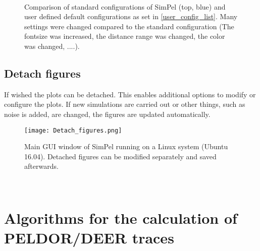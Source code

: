 \documentclass[pdftex,bezier,german,a4,twoside, headexclude,12pt,nochapterprefix, titlepage]{extarticle}
\newcommand{\simpel}{\textsf{SimPel} }
\newcommand{\figspace}{\hspace{0.5cm}}
\begin{document}
\begin{figure}[!htb]
\centering
     \figspace
      \\[-0.3cm]
     \figspace
    \caption{Comparison of standard configurations of \simpel (top, blue) and user defined default configurations as set in \autoref{user_config_list}. Many settings were changed compared to the standard configuration (The fontsize was increased, the distance range was changed, the color was changed, ....).}
\label{Different_config_figures}
\end{figure} 



\subsection{Detach figures}
If wished the plots can be detached. This enables additional options to modify or configure the plots. If new simulations are carried out
or other things, such as noise is added, are changed, the figures are updated automatically.
\begin{figure}[h!]
\begin{center}
\texttt{[image: Detach\_figures.png]}
\caption{Main GUI window of \simpel running on a Linux system (Ubuntu 16.04). Detached figures can be modified separately and saved afterwards.}
\label{Detach_figure}
\end{center}
\end{figure}
\
\\
\newpage
\section{Algorithms for the calculation of PELDOR/DEER traces}
\end{document}
